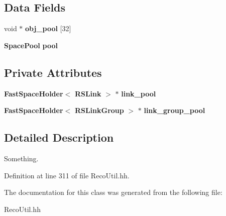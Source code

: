 \subsection*{Data Fields}
\begin{DoxyCompactItemize}
\item 
void $\ast$ {\bfseries obj\-\_\-pool} [32]\label{classRS_aff4e259ae5012e7916f8e52f6755b413}

\item 
{\bf Space\-Pool} {\bfseries pool}\label{classRS_ac985cded70310952e9b69aa86e0d6525}

\end{DoxyCompactItemize}
\subsection*{Private Attributes}
\begin{DoxyCompactItemize}
\item 
{\bf Fast\-Space\-Holder}$<$ {\bf R\-S\-Link} $>$ $\ast$ {\bfseries link\-\_\-pool}\label{classRS_a4fc74f14d80ae96f630d0be93ff418aa}

\item 
{\bf Fast\-Space\-Holder}$<$ {\bf R\-S\-Link\-Group} $>$ $\ast$ {\bfseries link\-\_\-group\-\_\-pool}\label{classRS_a34c8f9118059702b3a88b53e4ddfe5d6}

\end{DoxyCompactItemize}


\subsection{Detailed Description}
Something. 

Definition at line 311 of file Reco\-Util.\-hh.



The documentation for this class was generated from the following file\-:\begin{DoxyCompactItemize}
\item 
Reco\-Util.\-hh\end{DoxyCompactItemize}
